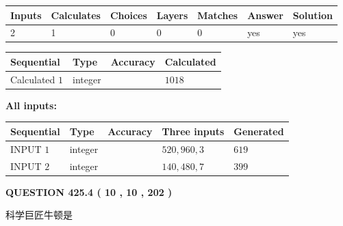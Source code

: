 \documentclass{ctexart}
\begin{document}
 
\noindent{}
 
 

 
   
   
   
   
\noindent\begin{tabular}{|l|l|l|l|l|l|l|}
 \hline
Inputs & Calculates & Choices & Layers & Matches & Answer & Solution \\ \hline
 2  & 
 1  & 
 0
  & 
 0  & 
 0  & 
  yes & 
  yes 
  \\ \hline
 \end{tabular}
   
   
   
   
\noindent{}
   
   
  
  
\noindent\begin{tabular}{|l|l|l|l|}
\hline
 Sequential & Type & Accuracy & Calculated \\ 
\hline
 
 
  Calculated $  1 $ & integer &  & 
  $ 1018 $ 
 \\  \hline  
 \end{tabular}
   
   
   
   
\noindent\vspace{0.1in}\hspace{-0.08in} {\textbf{\Large{All inputs: }}}
   
   
  
  
\noindent\begin{tabular}{|l|l|l|l|l|}
\hline
 Sequential & Type & Accuracy & Three inputs & Generated \\ 
\hline
 
 
  INPUT $  1 $ & integer &  & $
 520
 , 
 960
 , 
 3
 $ & $ 619 $ 
 \\  \hline  
 
 
  INPUT $  2 $ & integer &  & $
 140
 , 
 480
 , 
 7
 $ & $ 399 $ 
 \\  \hline  
 \end{tabular}
   
   
  
\vspace{0.2in}
  
{\textbf{\Large{QUESTION
425.4 
 ( 10 , 10 , 202 )
}}}
  
  
科学巨匠牛顿是
 
\end{document}
